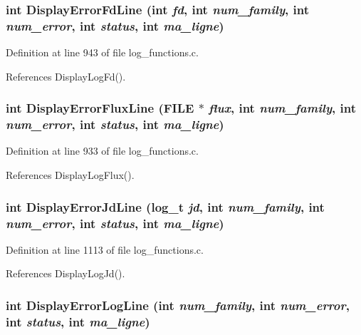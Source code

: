 \subsubsection{\setlength{\rightskip}{0pt plus 5cm}int Display\-Error\-Fd\-Line (int {\em fd}, int {\em num\_\-family}, int {\em num\_\-error}, int {\em status}, int {\em ma\_\-ligne})}\label{log__functions_8c_a88}




Definition at line 943 of file log\_\-functions.c.

References Display\-Log\-Fd().
\subsubsection{\setlength{\rightskip}{0pt plus 5cm}int Display\-Error\-Flux\-Line (FILE $\ast$ {\em flux}, int {\em num\_\-family}, int {\em num\_\-error}, int {\em status}, int {\em ma\_\-ligne})}\label{log__functions_8c_a87}




Definition at line 933 of file log\_\-functions.c.

References Display\-Log\-Flux().
\subsubsection{\setlength{\rightskip}{0pt plus 5cm}int Display\-Error\-Jd\-Line (log\_\-t {\em jd}, int {\em num\_\-family}, int {\em num\_\-error}, int {\em status}, int {\em ma\_\-ligne})}\label{log__functions_8c_a93}




Definition at line 1113 of file log\_\-functions.c.

References Display\-Log\-Jd().
\subsubsection{\setlength{\rightskip}{0pt plus 5cm}int Display\-Error\-Log\-Line (int {\em num\_\-family}, int {\em num\_\-error}, int {\em status}, int {\em ma\_\-ligne})}\label{log__functions_8c_a89}




